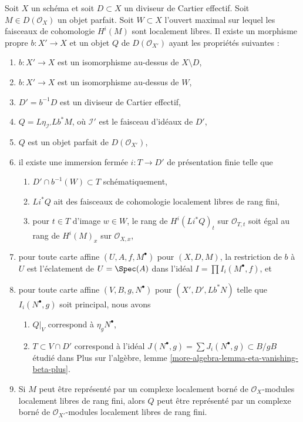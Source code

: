 \begin{lemma}
\label{lemma-complex-and-divisor-derived}
Soit $X$ un schéma et soit $D \subset X$ un diviseur de Cartier effectif. Soit
$M \in D(\mathcal{O}_X)$ un objet parfait. Soit $W \subset X$ l'ouvert maximal
sur lequel les faisceaux de cohomologie $H^i(M)$ sont localement libres.
Il existe un morphisme propre $b : X' \longrightarrow X$
et un objet $Q$ de $D(\mathcal{O}_{X'})$ ayant les propriétés suivantes :
\begin{enumerate}
\item $b : X' \to X$ est un isomorphisme au-dessus de $X \setminus D$,
\item $b : X' \to X$ est un isomorphisme au-dessus de $W$,
\item $D' = b^{-1}D$ est un diviseur de Cartier effectif,
\item $Q = L\eta_{\mathcal{I}'}Lb^*M$, où $\mathcal{I}'$
est le faisceau d'idéaux de $D'$,
\item $Q$ est un objet parfait de $D(\mathcal{O}_{X'})$,
\item il existe une immersion fermée $i : T \to D'$ de présentation finie
telle que
\begin{enumerate}
\item $D' \cap b^{-1}(W) \subset T$ schématiquement,
\item $Li^*Q$ ait des faisceaux de cohomologie localement libres de rang fini,
\item pour $t \in T$ d'image $w \in W$, le rang
de $H^i(Li^*Q)_t$ sur $\mathcal{O}_{T, t}$ soit égal au
rang de $H^i(M)_x$ sur $\mathcal{O}_{X, x}$,
\end{enumerate}
\item pour toute carte affine $(U, A, f, M^\bullet)$ pour $(X, D, M)$,
la restriction de $b$ à $U$ est l'éclatement de $U = \Spec(A)$
dans l'idéal $I = \prod I_i(M^\bullet, f)$, et
\item pour toute carte affine $(V, B, g, N^\bullet)$ pour $(X', D', Lb^*N)$
telle que $I_i(N^\bullet, g)$ soit principal, nous avons
\begin{enumerate}
\item $Q|_V$ correspond à $\eta_gN^\bullet$,
\item $T \subset V \cap D'$ correspond à l'idéal
$J(N^\bullet, g) = \sum J_i(N^\bullet, g) \subset B/gB$
étudié dans
Plus sur l'algèbre, lemme \ref{more-algebra-lemma-eta-vanishing-beta-plus}.
\end{enumerate}
\item Si $M$ peut être représenté par un complexe localement borné
de $\mathcal{O}_X$-modules localement libres de rang fini, alors $Q$ peut
être représenté par un complexe borné de
$\mathcal{O}_{X'}$-modules localement libres de rang fini.
\end{enumerate}
\end{lemma}

